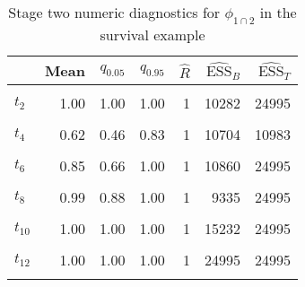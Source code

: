 \begin{table}

\caption{\label{tab:surv-stage-two-diag-phi-12}Stage two numeric diagnostics for $\phi_{1 \cap 2}$ in the survival example}
\centering
\begin{tabular}[t]{lrrrrrr}
\toprule
  & Mean & $q_{0.05}$ & $q_{0.95}$ & $\widehat{R}$ & $\widehat{\text{ESS}}_{B}$ & $\widehat{\text{ESS}}_{T}$\\
\midrule
\cellcolor{gray!6}{$t_{1}$} & \cellcolor{gray!6}{1.00} & \cellcolor{gray!6}{1.00} & \cellcolor{gray!6}{1.00} & \cellcolor{gray!6}{1} & \cellcolor{gray!6}{12725} & \cellcolor{gray!6}{24995}\\
$t_{2}$ & 1.00 & 1.00 & 1.00 & 1 & 10282 & 24995\\
\cellcolor{gray!6}{$t_{3}$} & \cellcolor{gray!6}{0.98} & \cellcolor{gray!6}{0.84} & \cellcolor{gray!6}{1.00} & \cellcolor{gray!6}{1} & \cellcolor{gray!6}{8305} & \cellcolor{gray!6}{24995}\\
$t_{4}$ & 0.62 & 0.46 & 0.83 & 1 & 10704 & 10983\\
\cellcolor{gray!6}{$t_{5}$} & \cellcolor{gray!6}{1.00} & \cellcolor{gray!6}{1.00} & \cellcolor{gray!6}{1.00} & \cellcolor{gray!6}{1} & \cellcolor{gray!6}{24995} & \cellcolor{gray!6}{24995}\\
$t_{6}$ & 0.85 & 0.66 & 1.00 & 1 & 10860 & 24995\\
\cellcolor{gray!6}{$t_{7}$} & \cellcolor{gray!6}{1.00} & \cellcolor{gray!6}{1.00} & \cellcolor{gray!6}{1.00} & \cellcolor{gray!6}{1} & \cellcolor{gray!6}{24995} & \cellcolor{gray!6}{24995}\\
$t_{8}$ & 0.99 & 0.88 & 1.00 & 1 & 9335 & 24995\\
\cellcolor{gray!6}{$t_{9}$} & \cellcolor{gray!6}{1.00} & \cellcolor{gray!6}{1.00} & \cellcolor{gray!6}{1.00} & \cellcolor{gray!6}{1} & \cellcolor{gray!6}{25014} & \cellcolor{gray!6}{24995}\\
$t_{10}$ & 1.00 & 1.00 & 1.00 & 1 & 15232 & 24995\\
\cellcolor{gray!6}{$t_{11}$} & \cellcolor{gray!6}{0.63} & \cellcolor{gray!6}{0.41} & \cellcolor{gray!6}{0.97} & \cellcolor{gray!6}{1} & \cellcolor{gray!6}{10156} & \cellcolor{gray!6}{11483}\\
$t_{12}$ & 1.00 & 1.00 & 1.00 & 1 & 24995 & 24995\\
\cellcolor{gray!6}{$t_{13}$} & \cellcolor{gray!6}{1.00} & \cellcolor{gray!6}{1.00} & \cellcolor{gray!6}{1.00} & \cellcolor{gray!6}{1} & \cellcolor{gray!6}{17269} & \cellcolor{gray!6}{24995}\\

\end{tabular}
\end{table}
